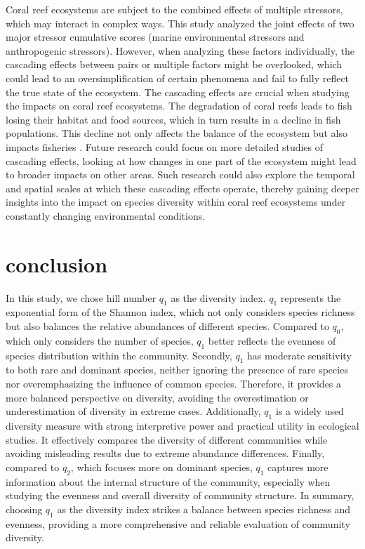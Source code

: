 \documentclass[a4paper, 11]{article}
\begin{document}
Coral reef ecosystems are subject to the combined effects of multiple stressors, which may interact in complex ways. This study analyzed the joint effects of two major stressor cumulative scores (marine environmental stressors and anthropogenic stressors). However, when analyzing these factors individually, the cascading effects between pairs or multiple factors might be overlooked, which could lead to an oversimplification of certain phenomena and fail to fully reflect the true state of the ecosystem. The cascading effects are crucial when studying the impacts on coral reef ecosystems. The degradation of coral reefs leads to fish losing their habitat and food sources, which in turn results in a decline in fish populations. This decline not only affects the balance of the ecosystem but also impacts fisheries \citep{hoegh2011impact}. Future research could focus on more detailed studies of cascading effects, looking at how changes in one part of the ecosystem might lead to broader impacts on other areas. Such research could also explore the temporal and spatial scales at which these cascading effects operate,  thereby gaining deeper insights into the impact on species diversity within coral reef ecosystems under constantly changing environmental conditions.


\section{conclusion}
In this study, we chose hill number \(q_1\) as the diversity index. \(q_1\) represents the exponential form of the Shannon index, which not only considers species richness but also balances the relative abundances of different species. Compared to \(q_0\), which only considers the number of species, \(q_1\) better reflects the evenness of species distribution within the community. Secondly, \(q_1\) has moderate sensitivity to both rare and dominant species, neither ignoring the presence of rare species nor overemphasizing the influence of common species. Therefore, it provides a more balanced perspective on diversity, avoiding the overestimation or underestimation of diversity in extreme cases. Additionally, \(q_1\) is a widely used diversity measure with strong interpretive power and practical utility in ecological studies. It effectively compares the diversity of different communities while avoiding misleading results due to extreme abundance differences. Finally, compared to \(q_2\), which focuses more on dominant species, \(q_1\) captures more information about the internal structure of the community, especially when studying the evenness and overall diversity of community structure. In summary, choosing \(q_1\) as the diversity index strikes a balance between species richness and evenness, providing a more comprehensive and reliable evaluation of community diversity.
\end{document}
